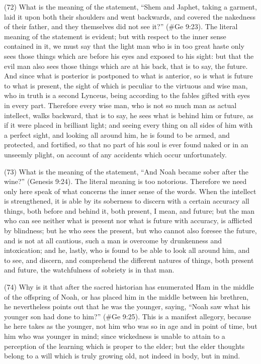 (72) What is the meaning of the statement, ``Shem and Japhet, taking a garment, laid it upon both
their shoulders and went backwards, and covered the nakedness of their father, and they
themselves did not see it?'' (\#Ge 9:23). The literal meaning of the statement is evident; but with
respect to the inner sense contained in it, we must say that the light man who is in too great haste
only sees those things which are before his eyes and exposed to his sight: but that the evil man
also sees those things which are at his back, that is to say, the future. And since what is posterior
is postponed to what is anterior, so is what is future to what is present, the sight of which is
peculiar to the virtuous and wise man, who in truth is a second Lynceus, being according to the
fables gifted with eyes in every part. Therefore every wise man, who is not so much man as actual
intellect, walks backward, that is to say, he sees what is behind him or future, as if it were placed in
brilliant light; and seeing every thing on all sides of him with a perfect sight, and looking all around
him, he is found to be armed, and protected, and fortified, so that no part of his soul is ever found
naked or in an unseemly plight, on account of any accidents which occur unfortunately.

(73) What is the meaning of the statement, ``And Noah became sober after the wine?'' (Genesis
9:24). The literal meaning is too notorious. Therefore we need only here speak of what concerns
the inner sense of the words. When the intellect is strengthened, it is able by its soberness to
discern with a certain accuracy all things, both before and behind it, both present, I mean, and
future; but the man who can see neither what is present nor what is future with accuracy, is
afflicted by blindness; but he who sees the present, but who cannot also foresee the future, and is
not at all cautious, such a man is overcome by drunkenness and intoxication; and he, lastly, who is
found to be able to look all around him, and to see, and discern, and comprehend the different
natures of things, both present and future, the watchfulness of sobriety is in that man.

(74) Why is it that after the sacred historian has enumerated Ham in the middle of the offspring of
Noah, or has placed him in the middle between his brethren, he nevertheless points out that he was
the younger, saying, ``Noah saw what his younger son had done to him?'' (\#Ge 9:25). This is a
manifest allegory, because he here takes as the younger, not him who was so in age and in point
of time, but him who was younger in mind; since wickedness is unable to attain to a perception of
the learning which is proper to the elder; but the elder thoughts belong to a will which is truly growing
old, not indeed in body, but in mind.

